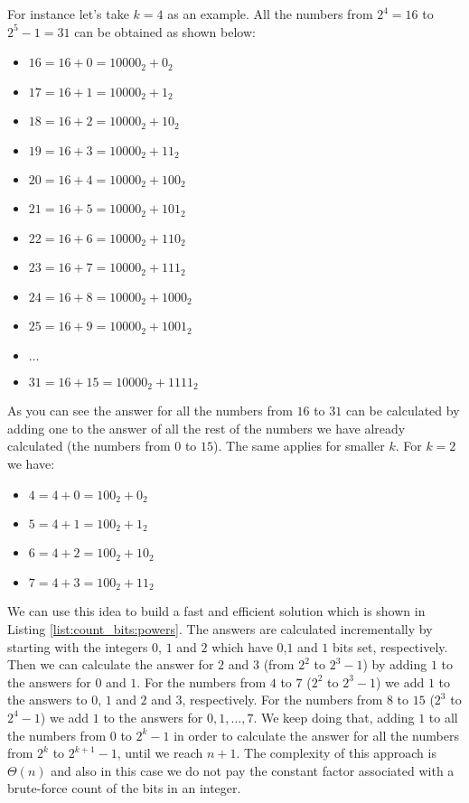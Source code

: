For instance let's take $k=4$ as an example. All the numbers from $2^4 = 16$ to $2^5-1 = 31$ can be
obtained as shown below:
\begin{itemize}
	\item $16 = 16+0 = 10000_2+ 0_2$
	\item $17 = 16+1 = 10000_2+ 1_2$
	\item $18 = 16+2 = 10000_2+ 10_2$
	\item $19 = 16+3 = 10000_2+ 11_2$
	\item $20 = 16+4 = 10000_2+ 100_2$
	\item $21 = 16+5 = 10000_2+ 101_2$
	\item $22 = 16+6 = 10000_2+ 110_2$
	\item $23 = 16+7 = 10000_2+ 111_2$
	\item $24 = 16+8 = 10000_2+ 1000_2$
	\item $25 = 16+9 = 10000_2+ 1001_2$
	\item $\ldots$
	\item $31 = 16+15 = 10000_2+ 1111_2$
\end{itemize}
As you can see the answer for all the numbers from $16$ to $31$ can be calculated by adding one to
the answer of all the rest of the numbers we have already calculated (the numbers from $0$ to $15$).
The same applies for smaller $k$. For $k=2$ we have:
\begin{itemize}
	\item $4 = 4+0 = 100_2+ 0_2$
	\item $5 = 4+1 = 100_2+ 1_2$
	\item $6 = 4+2 = 100_2+ 10_2$
	\item $7 = 4+3 = 100_2+ 11_2$
\end{itemize}
We can use this idea to build a fast and efficient solution which is shown in Listing \ref{list:count_bits:powers}.
The answers are calculated incrementally by starting with the integers $0$, $1$ and $2$ which have $0$,$1$ and
$1$ bits set, respectively.
Then we can calculate the answer for $2$ and $3$ (from $2^2$ to $2^3-1$)
by adding $1$ to the answers for $0$ and $1$.
For the numbers from $4$ to $7$ ($2^2$ to $2^3-1$) we
add $1$ to the answers to $0$, $1$ and $2$ and $3$, respectively.
For the numbers from $8$ to $15$ ($2^3$ to
$2^4-1$) we add $1$ to the answers for $0, 1, \ldots,7$.
We keep doing that, adding $1$ to all the
numbers from $0$ to $2^k-1$ in order to calculate the answer for all the numbers from $2^k$ to
$2^{k+1}-1$, until we reach $n+1$.
The complexity of this approach is $\Theta(n)$ and also in this
case we do not pay the constant factor associated with a brute-force count of the bits in an
integer.


